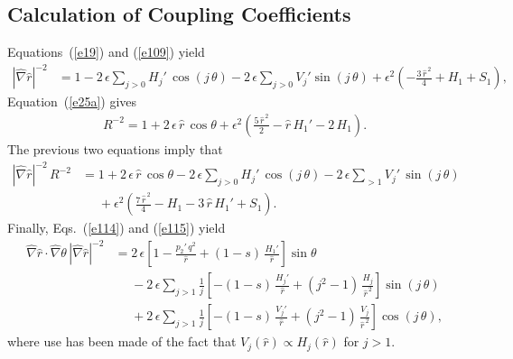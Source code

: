 \documentclass[12pt,prb,aps]{revtex4-1}
\begin{document}
\subsection{Calculation of Coupling Coefficients}
Equations~(\ref{e19}) and (\ref{e109}) yield 
\begin{align}\label{e115}
|\hat{\nabla}\hat{r}|^{-2} &= 1 - 2\,\epsilon\sum_{j>0}H_j'\,\cos(j\,\theta) - 2\,\epsilon\sum_{j>0}V_j'\sin(j\,\theta)
+ \epsilon^2\left(-\frac{3\,\hat{r}^{\,2}}{4} + H_1 + S_1\right),
\end{align}
Equation~(\ref{e25a}) gives
\begin{align}
R^{-2}= 1 + 2\,\epsilon\,\hat{r}\,\cos\theta +\epsilon^2\left(\frac{5\,\hat{r}^{\,2}}{2} - \hat{r}\,H_1'-2\,H_1\right).
\end{align}
The previous two equations imply that
\begin{align}\label{e117}
|\hat{\nabla}\hat{r}|^{-2} \,R^{-2}&= 1 +2\,\epsilon\,\hat{r}\,\cos\theta -2\,\epsilon \sum_{j>0}H_j'\,\cos(j\,\theta) -2\,\epsilon\sum_{>1}V_j'\,\sin(j\,\theta)\nonumber\\[0.5ex]
&\phantom{=} + \epsilon^2\left(\frac{7\,\hat{r}^{\,2}}{4} - H_1 -3\,\hat{r}\,H_1' + S_1\right).
\end{align}
Finally, Eqs.~(\ref{e114}) and (\ref{e115}) yield
\begin{align}\label{e118}
\hat{\nabla}\hat{r}\cdot\hat{\nabla}\theta \,|\hat{\nabla}\hat{r}|^{-2} &= 2\,\epsilon\left[1-\frac{p_2'\,q^2}{\hat{r}} +(1-s)\,\frac{H_1'}{\hat{r}}\right]\sin\theta\nonumber\\[0.5ex]
&\phantom{=}-2\,\epsilon\sum_{j>1}\frac{1}{j}\left[-(1-s)\,\frac{H_j'}{\hat{r}} + (j^2-1)\,\frac{H_j}{\hat{r}^{\,2}}\right]\sin(j\,\theta)\nonumber\\[0.5ex]
&\phantom{=}+2\,\epsilon\sum_{j>1}\frac{1}{j}\left[-(1-s)\,\frac{V_j'}{\hat{r}} + (j^2-1)\,\frac{V_j}{\hat{r}^{\,2}}\right]\cos(j\,\theta),
\end{align}
where use has been made of the fact that $V_j(\hat{r})\propto H_j(\hat{r})$ for $j>1$. 
\end{document}
